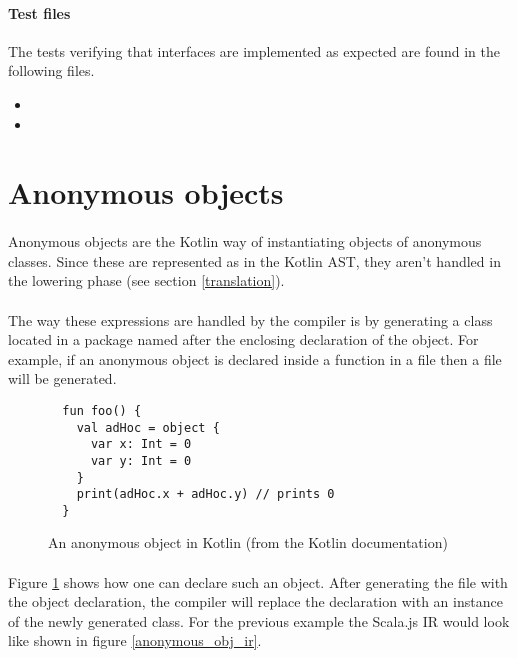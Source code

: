 \paragraph{Test files} The tests verifying that interfaces are implemented as expected are 
found in the following files.

\begin{itemize}
 \item {}
 \item {}
\end{itemize}

\section{Anonymous objects} \label{anonymous_objects}

\paragraph{} Anonymous objects are the Kotlin way of instantiating objects of anonymous classes. 
Since these are represented as  in the Kotlin AST, they aren't 
handled in the lowering phase (see section \ref{translation}).

\paragraph{} The way these expressions are handled by the compiler is by generating a class located 
in a package named after the enclosing declaration of the object. For example, if an anonymous 
object is declared inside a function  in a file  then a file 
 will be generated.

\begin{figure}[h]
  \begin{verbatim}
  fun foo() {
    val adHoc = object {
      var x: Int = 0
      var y: Int = 0
    }
    print(adHoc.x + adHoc.y) // prints 0
  }
  \end{verbatim}
  \caption{An anonymous object in Kotlin (from the Kotlin documentation)}
  \label{anonymous_obj_decl}
\end{figure}

\paragraph{} Figure \ref{anonymous_obj_decl} shows how one can declare such an object. After 
generating the file with the object declaration, the compiler will replace the declaration with an 
instance of the newly generated class. For the previous example the Scala.js IR would look like 
shown in figure \ref{anonymous_obj_ir}.


